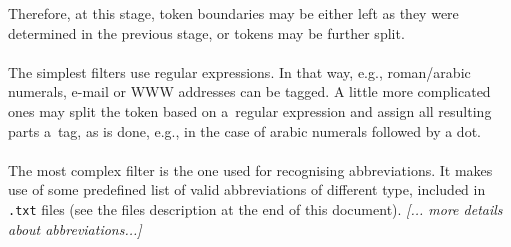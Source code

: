\documentclass[oneside,12pt]{article}
\begin{document}
Therefore, at this stage, token boundaries may be either left as they were determined in the previous stage, or tokens may be further split.
    
\paragraph{}
The simplest filters use regular expressions. In that way, e.g., roman/arabic numerals, e-mail or WWW addresses can be tagged. A little more complicated ones may split the token based on a~regular expression and assign all resulting parts a~tag, as is done, e.g., in the case of arabic numerals followed by a dot.

\paragraph{}
The most complex filter is the one used for recognising abbreviations. It makes use of some predefined list of valid abbreviations of different type, included in \texttt{.txt} files (see the files description at the end of this document). \textit{[... more details about abbreviations...]}
\end{document}
